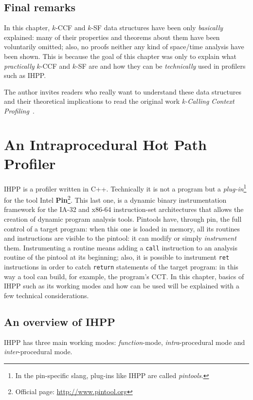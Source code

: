 \documentclass[a4paper,10pt]{report}
\begin{document}
\section{Final remarks}

In this chapter, $k$-CCF and $k$-SF data structures have been only \emph{basically} explained: many of their properties and theorems about them have been voluntarily omitted; 
also, no proofs neither any kind of space\slash time analysis have been shown.
This is because the goal of this chapter was only to explain what \emph{practically} $k$-CCF and $k$-SF are and how they can be \emph{technically} used in profilers such as IHPP. 

The author invites readers who really want to understand these data structures and their theoretical implications to read the original work \emph{k-Calling Context Profiling}~\cite{kccf}.


\chapter{An Intraprocedural Hot Path Profiler}

IHPP is a profiler written in C++. Technically it is not a program but
 a \emph{plug-in}\footnote{In the pin-specific slang,
plug-ins like IHPP are called \emph{pintools}.} for the tool 
Intel \textbf{Pin}\footnote{Official page: \url{http://www.pintool.org}}.
This last one, is a dynamic binary instrumentation framework for the IA-32 and x86-64 instruction-set architectures that allows the creation of dynamic program analysis tools. 
Pintools have, through pin, the full control of a target program: 
when this one is loaded in memory, all its routines and instructions are visible
to the pintool: it can modify or simply \emph{instrument} them. 
Instrumenting a routine means adding a \verb|call| instruction to an analysis 
routine of the pintool at its beginning; also, it is possible to instrument \verb|ret| instructions 
in order to catch \verb|return| statements of the target program: 
in this way a tool can build, for example, the program's CCT.
In this chapter, basics of IHPP such as its working modes and how can be used will be explained with a few technical considerations.

\section{An overview of IHPP}

IHPP has three main working modes: \emph{function}-mode, \emph{intra}-procedural mode and \emph{inter}-procedural mode. 
\end{document}
